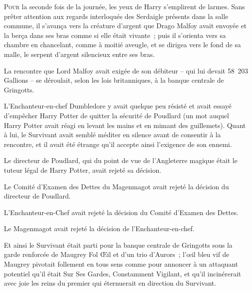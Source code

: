 
\lettrine{P}{our} la seconde fois de la journée, les yeux de Harry s'emplirent de larmes.
Sans prêter attention aux regards interloqués des Serdaigle présents dans la salle commune, il s'avança vers la créature d'argent que Drago Malfoy avait envoyée et la berça dans ses bras comme si elle était vivante~; puis il s'orienta vers sa chambre en chancelant, comme à moitié aveugle, et se dirigea vers le fond de sa malle, le serpent d'argent silencieux entre ses bras.


La rencontre que Lord Malfoy avait exigée de son débiteur -- qui lui devait 58~203 Gallions -- se déroulait, selon les lois britanniques, à la banque centrale de Gringotts.

L'Enchanteur-en-chef Dumbledore y avait quelque peu résisté et avait essayé d'empêcher Harry Potter de quitter la sécurité de Poudlard (un mot auquel Harry Potter avait réagi en levant les mains et en mimant des guillemets).
Quant à lui, le Survivant avait semblé méditer en silence avant de consentir à la rencontre, et il avait été étrange qu'il accepte ainsi l'exigence de son ennemi.

Le directeur de Poudlard, qui du point de vue de l'Angleterre magique était le tuteur légal de Harry Potter, avait rejeté sa décision.

Le Comité d'Examen des Dettes du Magenmagot avait rejeté la décision du directeur de Poudlard.

L'Enchanteur-en-Chef avait rejeté la décision du Comité d'Examen des Dettes.

Le Magenmagot avait rejeté la décision de l'Enchanteur-en-chef.

Et ainsi le Survivant était parti pour la banque centrale de Gringotts sous la garde renforcée de Maugrey Fol Œil et d'un trio d'Aurors~; l'œil bleu vif de Maugrey pivotait follement en tous sens comme pour annoncer à un attaquant potentiel qu'il était Sur Ses Gardes, Constamment Vigilant, et qu'il incinérerait avec joie les reins du premier qui éternuerait en direction du Survivant.

